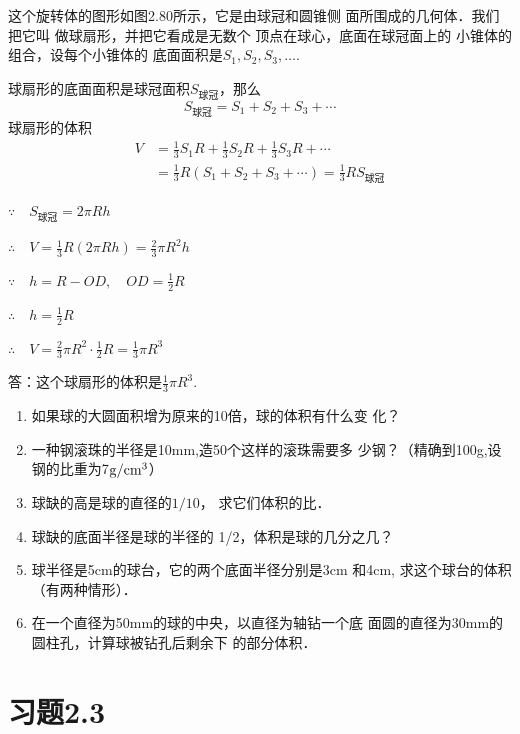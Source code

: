 \begin{solution}
    这个旋转体的图形如图2.80所示，它是由球冠和圆锥侧
面所围成的几何体．我们把它叫
做球扇形，并把它看成是无数个
顶点在球心，底面在球冠面上的
小锥体的组合，设每个小锥体的
底面面积是$S_1,S_2,S_3,\ldots$. 

球扇形的底面面积是球冠面积$S_{\text{球冠}}$，那么
\[S_{\text{球冠}}=S_1+S_2+S_3+\cdots\]
球扇形的体积
\[\begin{split}
    V&=\frac{1}{3}S_1R+\frac{1}{3}S_2R+\frac{1}{3}S_3R+\cdots\\
&=\frac{1}{3}R(S_1+S_2+S_3+\cdots)=\frac{1}{3}RS_{\text{球冠}}
\end{split}    
\]

$\because\quad S_{\text{球冠}}=2\pi Rh$

$\therefore\quad V=\frac{1}{3}R(2\pi Rh)=\frac{2}{3}\pi R^2h$

$\because\quad h=R-OD,\quad OD=\frac{1}{2}R$

$\therefore\quad h=\frac{1}{2}R$

$\therefore\quad V=\frac{2}{3}\pi R^2\cdot \frac{1}{2}R=\frac{1}{3}\pi R^3$

答：这个球扇形的体积是$\frac{1}{3}\pi R^3$.
\end{solution}



\begin{ex}
\begin{enumerate}
    \item 如果球的大圆面积增为原来的10倍，球的体积有什么变
    化？
    \item 一种钢滚珠的半径是10mm,造50个这样的滚珠需要多
    少钢？（精确到100g,设钢的比重为7${\rm g/cm^3}$）
    \item 球缺的高是球的直径的$1/10$，
    求它们体积的比．
    \item 球缺的底面半径是球的半径的
    1/2，体积是球的几分之几？
    \item 球半径是5cm的球台，它的两个底面半径分别是3cm
    和4cm, 求这个球台的体积（有两种情形）．
    \item 在一个直径为50mm的球的中央，以直径为轴钻一个底
    面圆的直径为30mm的圆柱孔，计算球被钻孔后剩余下
    的部分体积．
\end{enumerate}
\end{ex}

\section*{习题2.3}

